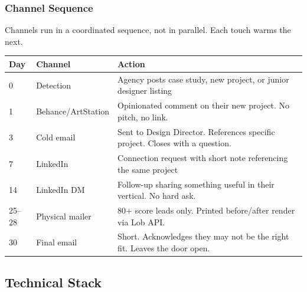 \documentclass[11pt, letterpaper]{article}
\begin{document}
\subsubsection{Channel Sequence}

Channels run in a coordinated sequence, not in parallel. Each touch warms the next.

\begin{table}[H]
\centering
\begin{tabularx}{\linewidth}{@{} l l X @{}}
  \toprule
  \textbf{Day} & \textbf{Channel} & \textbf{Action} \\
  \midrule
  0       & Detection          & Agency posts case study, new project, or junior designer listing \\
  1       & Behance/ArtStation & Opinionated comment on their new project. No pitch, no link. \\
  3       & Cold email         & Sent to Design Director. References specific project. Closes with a question. \\
  7       & LinkedIn           & Connection request with short note referencing the same project \\
  14      & LinkedIn DM        & Follow-up sharing something useful in their vertical. No hard ask. \\
  25--28  & Physical mailer    & 80+ score leads only. Printed before/after render via Lob API. \\
  30      & Final email        & Short. Acknowledges they may not be the right fit. Leaves the door open. \\
  \bottomrule
\end{tabularx}
\end{table}

\subsection{Technical Stack}
\end{document}
